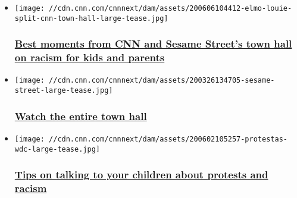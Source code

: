 \begin{itemize}
\item
  \href{/2020/06/06/us/cnn-sesame-street-town-hall-racism-trnd/index.html}{}

  \texttt{[image: //cdn.cnn.com/cnnnext/dam/assets/200606104412-elmo-louie-split-cnn-town-hall-large-tease.jpg]}

  \hypertarget{best-moments-from-cnn-and-sesame-streets-town-hall-on-racism-for-kids-and-parents}{%
  \subsubsection{\texorpdfstring{\href{/2020/06/06/us/cnn-sesame-street-town-hall-racism-trnd/index.html}{Best
  moments from CNN and Sesame Street's town hall on racism for kids and
  parents}}{Best moments from CNN and Sesame Street's town hall on racism for kids and parents}}\label{best-moments-from-cnn-and-sesame-streets-town-hall-on-racism-for-kids-and-parents}}
\item
  \href{/2020/06/06/app-news-section/cnn-sesame-street-race-town-hall-app-june-6-2020-app/index.html}{}

  \texttt{[image: //cdn.cnn.com/cnnnext/dam/assets/200326134705-sesame-street-large-tease.jpg]}

  \hypertarget{watch-the-entire-town-hall}{%
  \subsubsection{\texorpdfstring{\href{/2020/06/06/app-news-section/cnn-sesame-street-race-town-hall-app-june-6-2020-app/index.html}{Watch
  the entire town
  hall}}{Watch the entire town hall}}\label{watch-the-entire-town-hall}}
\item
  \href{/2020/06/01/health/protests-racism-talk-to-children-wellness/index.html}{}

  \texttt{[image: //cdn.cnn.com/cnnnext/dam/assets/200602105257-protestas-wdc-large-tease.jpg]}

  \hypertarget{tips-on-talking-to-your-children-about-protests-and-racism-}{%
  \subsubsection{\texorpdfstring{\href{/2020/06/01/health/protests-racism-talk-to-children-wellness/index.html}{Tips
  on talking to your children about protests and racism
  }}{Tips on talking to your children about protests and racism }}\label{tips-on-talking-to-your-children-about-protests-and-racism-}}
\end{itemize}

